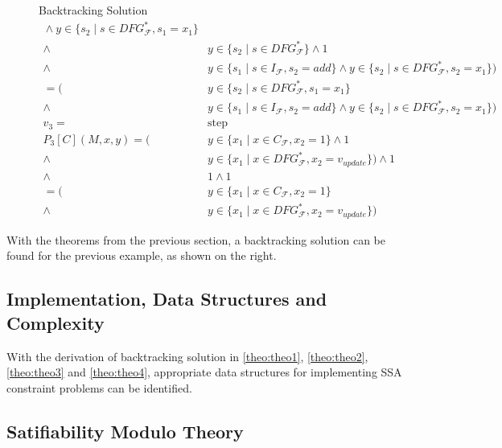 \begin{figure}[p]
\begin{blackwhitebox}{Backtracking Solution}
\begin{align*}
                \mathrel\land   y\in\{s_2\mid s\in DFG_\mathcal{F}^*,s_1=x_1\}\\
                \mathrel\land{}&y\in\{s_2\mid s\in DFG_\mathcal{F}^*\}
                \mathrel\land   1\\
                \mathrel\land{}&y\in\{s_1\mid s\in I_\mathcal{F},s_2=add\}
                \mathrel\land   y\in\{s_2\mid s\in DFG_\mathcal{F}^*,s_2=x_1\})\\[1em]
                         =    (&y\in\{s_2\mid s\in DFG_\mathcal{F}^*,s_1=x_1\}\\
                \mathrel\land{}&y\in\{s_1\mid s\in I_\mathcal{F},s_2=add\}
                \mathrel\land   y\in\{s_2\mid s\in DFG_\mathcal{F}^*,s_2=x_1\})\\[1em]
            v_3={}&\text{step}\\
            P_3[C](M,x,y)=  ({}&y\in\{x_1\mid x\in C_\mathcal{F}, x_2=1\}
                \mathrel\land   1\\
                \mathrel\land{}&y\in\{x_1\mid x\in DFG_\mathcal{F}^*, x_2=v_{update}\})
                \mathrel\land   1\\
                \mathrel\land{}&1
                \mathrel\land   1\\[1em]
                         =  ({}&y\in\{x_1\mid x\in C_\mathcal{F}, x_2=1\}\\
                \mathrel\land{}&y\in\{x_1\mid x\in DFG_\mathcal{F}^*, x_2=v_{update}\})
        \end{align*}
    \end{blackwhitebox}
\end{figure}

    With the theorems from the previous section, a backtracking solution can
    be found for the previous example, as shown on the right.


\subsection{Implementation, Data Structures and Complexity}

    With the derivation of backtracking solution in \autoref{theo:theo1},
    \autoref{theo:theo2}, \autoref{theo:theo3} and  \autoref{theo:theo4},
    appropriate data structures for implementing SSA constraint problems
    can be identified.

\subsection{Satifiability Modulo Theory}

